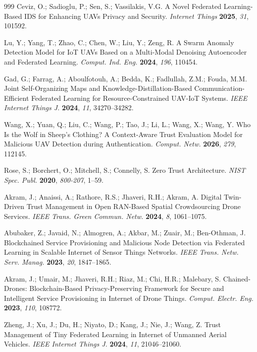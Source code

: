 \documentclass[notspecified,article,submit,moreauthors]{Definitions/mdpi}
\begin{document}
\begin{thebibliography}{999}
Ceviz, O.; Sadioglu, P.; Sen, S.; Vassilakis, V.G. A Novel Federated Learning-Based IDS for Enhancing UAVs Privacy and Security. {\em Internet Things} {\bf 2025}, {\em 31}, 101592.

Lu, Y.; Yang, T.; Zhao, C.; Chen, W.; Liu, Y.; Zeng, R. A Swarm Anomaly Detection Model for IoT UAVs Based on a Multi-Modal Denoising Autoencoder and Federated Learning. {\em Comput. Ind. Eng.} {\bf 2024}, {\em 196}, 110454.

Gad, G.; Farrag, A.; Aboulfotouh, A.; Bedda, K.; Fadlullah, Z.M.; Fouda, M.M. Joint Self-Organizing Maps and Knowledge-Distillation-Based Communication-Efficient Federated Learning for Resource-Constrained UAV-IoT Systems. {\em IEEE Internet Things J.} {\bf 2024}, {\em 11}, 34270--34282.

Wang, X.; Yuan, Q.; Liu, C.; Wang, P.; Tao, J.; Li, L.; Wang, X.; Wang, Y. Who Is the Wolf in Sheep's Clothing? A Context-Aware Trust Evaluation Model for Malicious UAV Detection during Authentication. {\em Comput. Netw.} {\bf 2026}, {\em 279}, 112145.

Rose, S.; Borchert, O.; Mitchell, S.; Connelly, S. Zero Trust Architecture. {\em NIST Spec. Publ.} {\bf 2020}, {\em 800-207}, 1--59.


Akram, J.; Anaissi, A.; Rathore, R.S.; Jhaveri, R.H.; Akram, A. Digital Twin-Driven Trust Management in Open RAN-Based Spatial Crowdsourcing Drone Services. {\em IEEE Trans. Green Commun. Netw.} {\bf 2024}, {\em 8}, 1061--1075.

Abubaker, Z.; Javaid, N.; Almogren, A.; Akbar, M.; Zuair, M.; Ben-Othman, J. Blockchained Service Provisioning and Malicious Node Detection via Federated Learning in Scalable Internet of Sensor Things Networks. {\em IEEE Trans. Netw. Serv. Manag.} {\bf 2023}, {\em 20}, 1847--1865.

Akram, J.; Umair, M.; Jhaveri, R.H.; Riaz, M.; Chi, H.R.; Malebary, S. Chained-Drones: Blockchain-Based Privacy-Preserving Framework for Secure and Intelligent Service Provisioning in Internet of Drone Things. {\em Comput. Electr. Eng.} {\bf 2023}, {\em 110}, 108772.

Zheng, J.; Xu, J.; Du, H.; Niyato, D.; Kang, J.; Nie, J.; Wang, Z. Trust Management of Tiny Federated Learning in Internet of Unmanned Aerial Vehicles. {\em IEEE Internet Things J.} {\bf 2024}, {\em 11}, 21046--21060.


\end{thebibliography}
\end{document}
